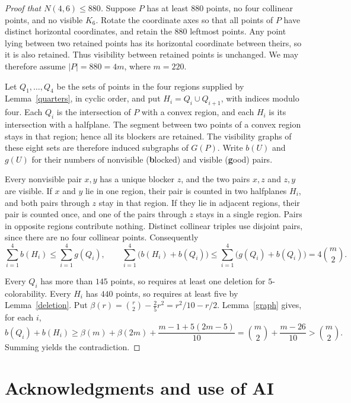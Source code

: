 \documentclass[11pt,a4paper]{amsart}
\begin{document}
\begin{proof}[Proof that $N(4,6)\le880$]
Suppose $P$ has at least $880$ points, no four collinear points, and no
visible $K_6$. Rotate the coordinate axes so that all points of $P$
have distinct horizontal coordinates, and retain the $880$ leftmost
points. Any point lying between two retained points has its horizontal
coordinate between theirs, so it is also retained. Thus visibility
between retained points is unchanged. We may therefore assume
$|P|=880=4m$, where $m=220$.

Let $Q_1,\ldots,Q_4$ be the sets of points in the four regions supplied
by Lemma~\ref{quarters}, in cyclic order, and put $H_i=Q_i\cup Q_{i+1}$,
with indices modulo four. Each $Q_i$ is the intersection of $P$ with a
convex region, and each $H_i$ is its intersection with a halfplane.
The segment between two points of a convex region stays in that region;
hence all its blockers are retained. The visibility graphs of these
eight sets are therefore induced subgraphs of $G(P)$. Write $b(U)$ and
$g(U)$ for their numbers of nonvisible (\textbf{b}locked) and visible (\textbf{g}ood) pairs.

Every nonvisible pair $x,y$ has a unique blocker $z$, and the two
pairs $x,z$ and $z,y$ are visible.
If $x$ and $y$ lie in one region, their pair is counted in two halfplanes
$H_i$, and both pairs through $z$ stay in that region. If they lie in
adjacent regions, their pair is counted once, and one of the pairs
through $z$ stays in a single region. Pairs in opposite regions contribute
nothing. Distinct collinear
triples use disjoint pairs, since there are no four collinear points.
Consequently
\[
 \sum_{i=1}^4 b(H_i)\le\sum_{i=1}^4g(Q_i),
 \qquad
 \sum_{i=1}^4\bigl(b(H_i)+b(Q_i)\bigr)\le \sum_{i=1}^4\bigl(g(Q_i)+b(Q_i)\bigr)    =4\binom m2.
\]

Every $Q_i$ has more than $145$ points, so requires at least one deletion
for $5$-colorability. Every $H_i$ has $440$ points, so requires at least
five by Lemma~\ref{deletion}. Put $\beta(r)=\binom r2 - \frac 25 r^2=r^2/10-r/2$.
Lemma~\ref{graph} gives, for each $i$,
\[
 b(Q_i)+b(H_i)
 \ge\beta(m)+\beta(2m)+\frac{m-1+5(2m-5)}{10}
 =\binom m2+\frac{m-26}{10}>\binom m2.
\]
Summing yields the contradiction.
\end{proof}

\section*{Acknowledgments and use of AI}
\end{document}
